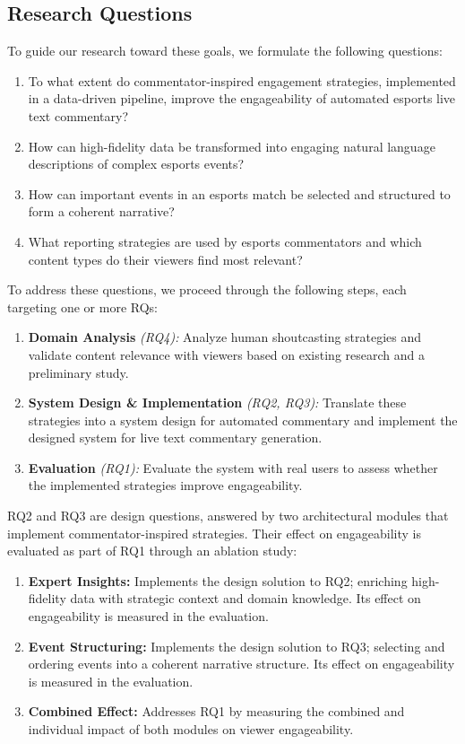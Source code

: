 \subsection{Research Questions}
To guide our research toward these goals, we formulate the following questions:
\begin{enumerate}[label=\textbf{RQ\arabic*:}]
  \item To what extent do commentator-inspired engagement strategies, implemented in a data-driven pipeline, improve the engageability of automated esports live text commentary?
  \item How can high-fidelity data be transformed into engaging natural language descriptions of complex esports events?
  \item How can important events in an esports match be selected and structured to form a coherent narrative?
  \item What reporting strategies are used by esports commentators and which content types do their viewers find most relevant?
\end{enumerate}

To address these questions, we proceed through the following steps, each targeting one or more RQs:
\begin{enumerate}
  \item \textbf{Domain Analysis} \textit{(RQ4):} Analyze human shoutcasting strategies and validate content relevance with viewers based on existing research and a preliminary study.
  \item \textbf{System Design \& Implementation} \textit{(RQ2, RQ3):} Translate these strategies into a system design for automated commentary and implement the designed system for live text commentary generation.
  \item \textbf{Evaluation} \textit{(RQ1):} Evaluate the system with real users to assess whether the implemented strategies improve engageability.
\end{enumerate}

RQ2 and RQ3 are design questions, answered by two architectural modules that implement commentator-inspired strategies. Their effect on engageability is evaluated as part of RQ1 through an ablation study:
\begin{enumerate}
  \item \textbf{Expert Insights:} Implements the design solution to RQ2; enriching high-fidelity data with strategic context and domain knowledge. Its effect on engageability is measured in the evaluation.
  \item \textbf{Event Structuring:} Implements the design solution to RQ3; selecting and ordering events into a coherent narrative structure. Its effect on engageability is measured in the evaluation.
  \item \textbf{Combined Effect:} Addresses RQ1 by measuring the combined and individual impact of both modules on viewer engageability.
\end{enumerate}

